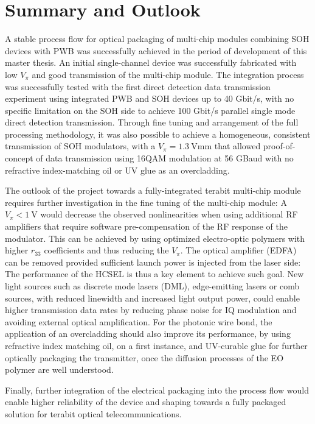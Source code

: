 
\chapter{Summary and Outlook}
\label{ch:Conclusion}

A stable process flow for optical packaging of multi-chip modules combining SOH devices with PWB was successfully achieved in the period of development of this master thesis. An initial single-channel device was successfully fabricated with low $V_\pi$ and good transmission of the multi-chip module. The integration process was successfully tested with the first direct detection data transmission experiment using integrated PWB and SOH devices up to 40 Gbit/s, with no specific limitation on the SOH side to achieve 100 Gbit/s parallel single mode direct detection transmission. 
Through fine tuning and arrangement of the full processing methodology, it was also possible to achieve a homogeneous, consistent  transmission of SOH modulators, with a $V_\pi=\SI{1.3}{\volt\milli\meter}$ that allowed proof-of-concept of data transmission using 16QAM modulation at 56 GBaud with no refractive index-matching oil or UV glue as an overcladding.
\par \medskip
The outlook of the project towards a fully-integrated terabit multi-chip module requires further investigation in the fine tuning of the multi-chip module: A $V_\pi<\SI{1}{\volt}$ would decrease the observed nonlinearities when using additional RF amplifiers that require software pre-compensation of the RF response of the modulator. This can be achieved by using optimized electro-optic polymers with higher $r_{33}$ coefficients and thus reducing the $V_\pi$. The optical amplifier (EDFA) can be removed provided sufficient launch power is  injected from the laser side: The performance of the HCSEL is thus a key element to achieve such goal. New light sources such as discrete mode lasers (DML), edge-emitting lasers or comb sources, with reduced linewidth and increased light output power, could enable higher transmission data rates by reducing phase noise for IQ modulation and avoiding external optical amplification. For the photonic wire bond, the application of an overcladding should also improve its performance, by using refractive index matching oil, on a first instance, and UV-curable glue for further optically packaging the transmitter, once the diffusion processes of the EO polymer are well understood.
\par \medskip
Finally, further integration of the electrical packaging into the process flow would enable higher reliability of the device and shaping towards a fully packaged solution for terabit optical telecommunications. 